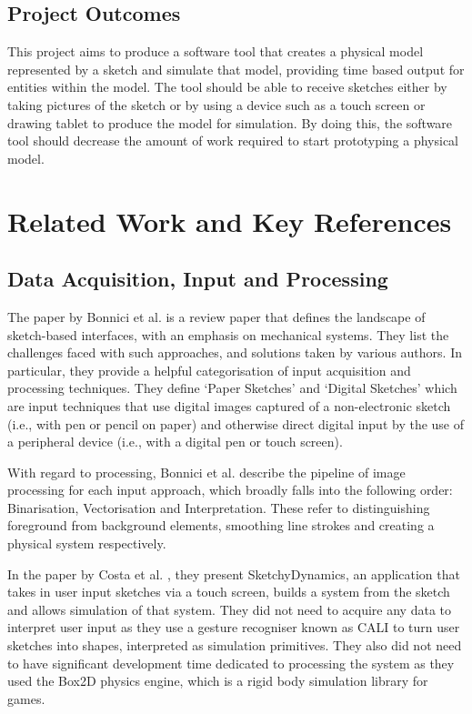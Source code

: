 \documentclass{article}
\begin{document}
\subsection{Project Outcomes}
\label{subsec:Project Outcomes}

This project aims to produce a software tool that creates a physical model represented by a sketch
and simulate that model, providing time based output for entities within the model. The tool
should be able to receive sketches either by taking pictures of the sketch or by using a device
such as a touch screen or drawing tablet to produce the model for simulation. By doing this, the
software tool should decrease the amount of work required to start prototyping a physical model.


\pagebreak
\section{Related Work and Key References}
\label{subsec:Related Work and Key References}

\subsection{Data Acquisition, Input and Processing}
\label{subsec:Data Acquisition, Input and Processing}

The paper by Bonnici et al. \cite{101017S} is a review paper that defines the landscape of sketch-based 
interfaces, with an emphasis on mechanical systems. They list the challenges faced with such approaches,
and solutions taken by various authors. In particular, they provide a helpful categorisation of input acquisition
and processing techniques. They define `Paper Sketches' and `Digital Sketches' which are input techniques that 
use digital images captured of a non-electronic sketch (i.e., with pen or pencil on paper) and otherwise
direct digital input by the use of a peripheral device (i.e., with a digital pen or touch screen). 

With regard to processing, Bonnici et al. describe the pipeline of image processing for each input approach, which 
broadly falls into the following order: Binarisation, Vectorisation and Interpretation. These refer to distinguishing
foreground from background elements, smoothing line strokes and creating a physical system respectively.

In the paper by Costa et al. \cite{109781I}, they present SketchyDynamics, an application that takes in
user input sketches via a touch screen, builds a system from the sketch and allows simulation of that system.
They did not need to acquire any data to interpret user input as they use a gesture recogniser known as CALI
to turn user sketches into shapes, interpreted as simulation primitives. They also did not need to have significant 
development time dedicated to processing the system as they used the Box2D physics engine, which is a rigid 
body simulation library for games.
\end{document}
